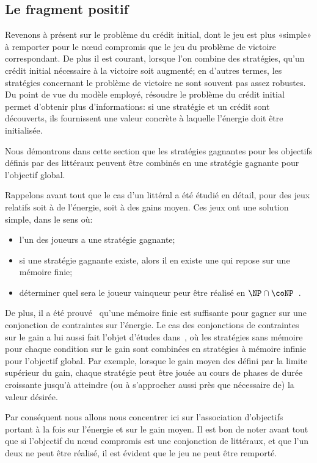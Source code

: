 \subsection{Le fragment positif}

Revenons à présent sur le problème du crédit initial, dont le jeu est plus «simple» à remporter pour le nœud compromis que le jeu du problème de victoire correspondant.
De plus il est courant, lorsque l'on combine des stratégies, qu'un crédit initial nécessaire à la victoire soit augmenté; en d'autres termes, les stratégies concernant le problème de victoire ne sont souvent pas assez robustes.
Du point de vue du modèle employé, résoudre le problème du crédit initial permet d'obtenir plus d'informations: si une stratégie et un crédit sont découverts, ils fournissent une valeur concrète à laquelle l'énergie doit être initialisée.

\bigskip

Nous démontrons dans cette section que les stratégies gagnantes pour les objectifs définis par des littéraux peuvent être combinés en une stratégie gagnante pour l'objectif global.

Rappelons avant tout que le cas d'un littéral a été étudié en détail, pour des jeux relatifs soit à de l'énergie, soit à des gains moyen.
Ces jeux ont une solution simple, dans le sens où:
\begin{itemize}
    \item l'un des joueurs a une stratégie gagnante;
    \item si une stratégie gagnante existe, alors il en existe une qui repose sur une mémoire finie;
    \item déterminer quel sera le joueur vainqueur peur être réalisé en $\NP\cap \coNP$~\cite{zwick96}.
\end{itemize}
De plus, il a été prouvé~\cite{velner12a} qu'une mémoire finie est suffisante pour gagner sur une conjonction de contraintes sur l'énergie.
Le cas des conjonctions de contraintes sur le gain a lui aussi fait l'objet d'études dans~\cite{velner12a}, où les stratégies sans mémoire pour chaque condition sur le gain sont combinées en stratégies à mémoire infinie pour l'objectif global.
Par exemple, lorsque le gain moyen des défini par la limite supérieur du gain, chaque stratégie peut être jouée au cours de phases de durée croissante jusqu'à atteindre (ou à s'approcher aussi près que nécessaire de) la valeur désirée.

Par conséquent nous allons nous concentrer ici sur l'association d'objectifs portant à la fois sur l'énergie et sur le gain moyen.
Il est bon de noter avant tout que si l'objectif du nœud compromis est une conjonction de littéraux, et que l'un deux ne peut être réalisé, il est évident que le jeu ne peut être remporté.

